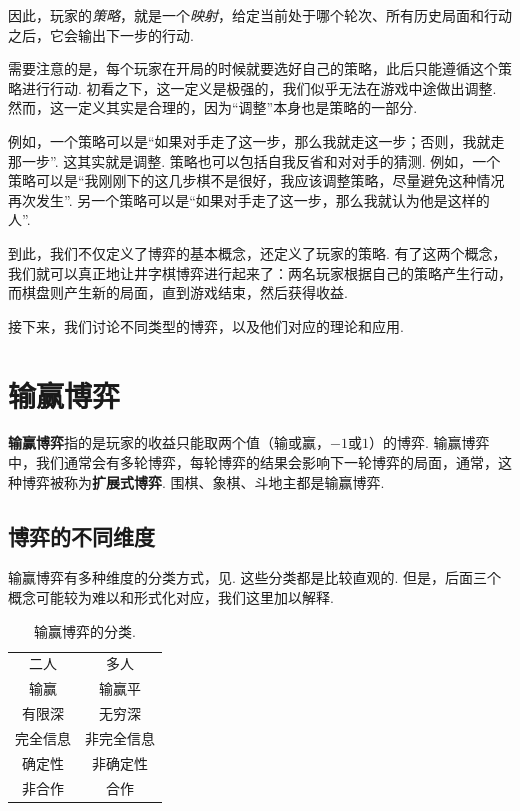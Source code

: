 因此，玩家的\emph{策略}，就是一个\emph{映射}，给定当前处于哪个轮次、所有历史局面和行动之后，它会输出下一步的行动. 

需要注意的是，每个玩家在开局的时候就要选好自己的策略，此后只能遵循这个策略进行行动. 初看之下，这一定义是极强的，我们似乎无法在游戏中途做出调整. 然而，这一定义其实是合理的，因为“调整”本身也是策略的一部分. 

例如，一个策略可以是“如果对手走了这一步，那么我就走这一步；否则，我就走那一步”. 这其实就是调整. 策略也可以包括自我反省和对对手的猜测. 例如，一个策略可以是“我刚刚下的这几步棋不是很好，我应该调整策略，尽量避免这种情况再次发生”. 另一个策略可以是“如果对手走了这一步，那么我就认为他是这样的人”.

到此，我们不仅定义了博弈的基本概念，还定义了玩家的策略. 有了这两个概念，我们就可以真正地让井字棋博弈进行起来了：两名玩家根据自己的策略产生行动，而棋盘则产生新的局面，直到游戏结束，然后获得收益. 

接下来，我们讨论不同类型的博弈，以及他们对应的理论和应用. 

\section{输赢博弈}

\textbf{输赢博弈}指的是玩家的收益只能取两个值（输或赢，$-1$或$1$）的博弈. 输赢博弈中，我们通常会有多轮博弈，每轮博弈的结果会影响下一轮博弈的局面，通常，这种博弈被称为\textbf{扩展式博弈}. 围棋、象棋、斗地主都是输赢博弈. 

\subsection{博弈的不同维度}

输赢博弈有多种维度的分类方式，见. 这些分类都是比较直观的. 但是，后面三个概念可能较为难以和形式化对应，我们这里加以解释. 

\begin{table}[ht]
    \centering
    \begin{tabular}{cc}
        二人 & 多人 \\
        输赢 & 输赢平\\
        有限深 & 无穷深 \\
        完全信息 & 非完全信息 \\
        确定性 & 非确定性 \\
        非合作 & 合作
    \end{tabular}
    \caption{输赢博弈的分类.}
    \label{tab:win-lose-game}
\end{table}

